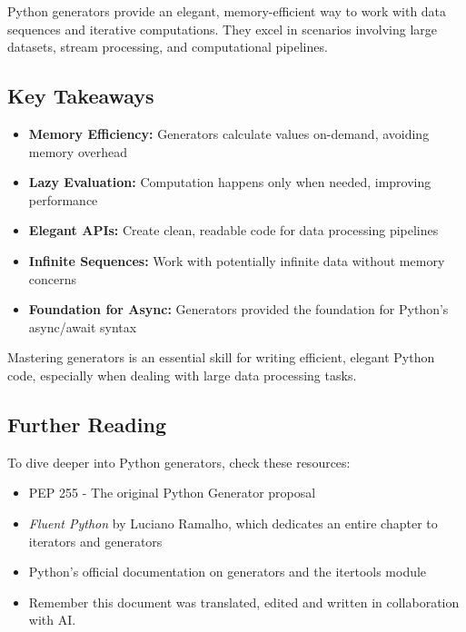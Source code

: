 \documentclass[12pt,letterpaper]{article}
\begin{document}
Python generators provide an elegant, memory-efficient way to work with data sequences and iterative computations. They excel in scenarios involving large datasets, stream processing, and computational pipelines.

\subsection{Key Takeaways}

\begin{itemize}
    \item \textbf{\textcolor{pythonBlue}{Memory Efficiency:}} Generators calculate values on-demand, avoiding memory overhead
    \item \textbf{\textcolor{pythonBlue}{Lazy Evaluation:}} Computation happens only when needed, improving performance
    \item \textbf{\textcolor{pythonBlue}{Elegant APIs:}} Create clean, readable code for data processing pipelines
    \item \textbf{\textcolor{pythonBlue}{Infinite Sequences:}} Work with potentially infinite data without memory concerns
    \item \textbf{\textcolor{pythonBlue}{Foundation for Async:}} Generators provided the foundation for Python's async/await syntax
\end{itemize}

Mastering generators is an essential skill for writing efficient, elegant Python code, especially when dealing with large data processing tasks.

\subsection{Further Reading}

To dive deeper into Python generators, check these resources:
\begin{itemize}
    \item PEP 255 - The original Python Generator proposal
    \item \textit{Fluent Python} by Luciano Ramalho, which dedicates an entire chapter to iterators and generators
    \item Python's official documentation on generators and the itertools module
    \item Remember this document was translated, edited and written in collaboration with AI.
\end{itemize}
\end{document}
